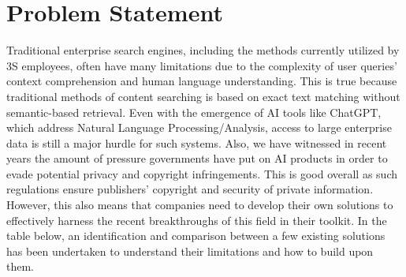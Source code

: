 \section{Problem Statement}
Traditional enterprise search engines, including the methods currently utilized by 3S employees, often have many limitations due to the complexity of user queries' context comprehension and human language understanding. This is true because traditional methods of content searching is based on exact text matching without semantic-based retrieval. Even with the emergence of AI tools like ChatGPT, which address Natural Language Processing/Analysis, access to large enterprise data is still a major hurdle for such systems. Also, we have witnessed in recent years the amount of pressure governments have put on AI products in order to evade potential privacy and copyright infringements. This is good overall as such regulations ensure publishers' copyright and security of private information. However, this also means that companies need to develop their own solutions to effectively harness the recent breakthroughs of this field in their toolkit.\medskip\newline
In the table below, an identification and comparison between a few existing solutions has been undertaken to understand their limitations and how to build upon them.
